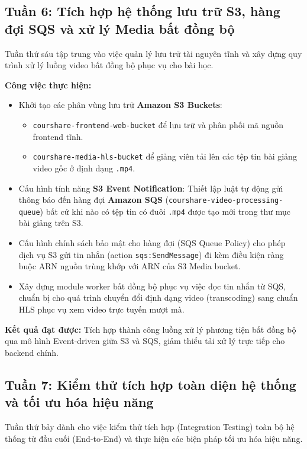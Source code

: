 \subsection{Tuần 6: Tích hợp hệ thống lưu trữ S3, hàng đợi SQS và xử lý Media bất đồng bộ}

Tuần thứ sáu tập trung vào việc quản lý lưu trữ tài nguyên tĩnh và xây dựng quy trình xử lý luồng video bất đồng bộ phục vụ cho bài học.

\textbf{Công việc thực hiện:}
\begin{itemize}
    \item Khởi tạo các phân vùng lưu trữ \textbf{Amazon S3 Buckets}:
    \begin{itemize}
        \item \texttt{courshare-frontend-web-bucket} để lưu trữ và phân phối mã nguồn frontend tĩnh.
        \item \texttt{courshare-media-hls-bucket} để giảng viên tải lên các tệp tin bài giảng video gốc ở định dạng \texttt{.mp4}.
    \end{itemize}
    \item Cấu hình tính năng \textbf{S3 Event Notification}: Thiết lập luật tự động gửi thông báo đến hàng đợi \textbf{Amazon SQS} (\texttt{courshare-video-processing-queue}) bất cứ khi nào có tệp tin có đuôi \texttt{.mp4} được tạo mới trong thư mục bài giảng trên S3.
    \item Cấu hình chính sách bảo mật cho hàng đợi (SQS Queue Policy) cho phép dịch vụ S3 gửi tin nhắn (action \texttt{sqs:SendMessage}) đi kèm điều kiện ràng buộc ARN nguồn trùng khớp với ARN của S3 Media bucket.
    \item Xây dựng module worker bất đồng bộ phục vụ việc đọc tin nhắn từ SQS, chuẩn bị cho quá trình chuyển đổi định dạng video (transcoding) sang chuẩn HLS phục vụ xem video trực tuyến mượt mà.
\end{itemize}

\textbf{Kết quả đạt được:} Tích hợp thành công luồng xử lý phương tiện bất đồng bộ qua mô hình Event-driven giữa S3 và SQS, giảm thiểu tải xử lý trực tiếp cho backend chính.

\subsection{Tuần 7: Kiểm thử tích hợp toàn diện hệ thống và tối ưu hóa hiệu năng}

Tuần thứ bảy dành cho việc kiểm thử tích hợp (Integration Testing) toàn bộ hệ thống từ đầu cuối (End-to-End) và thực hiện các biện pháp tối ưu hóa hiệu năng.

